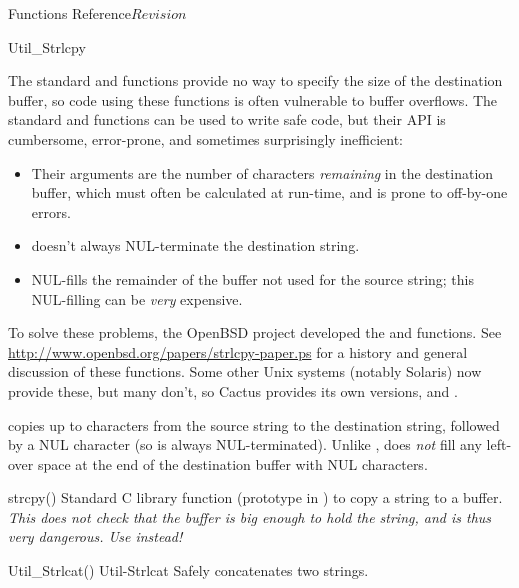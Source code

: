 \begin{cactuspart}{ Functions Reference}{}{$Revision$}
\begin{FunctionDescription}{Util\_Strlcpy}
\begin{Discussion}
The standard  and  functions provide
no way to specify the size of the destination buffer, so code using
these functions is often vulnerable to buffer overflows.  The standard
 and  functions can be used to write
safe code, but their API is cumbersome, error-prone, and sometimes
surprisingly inefficient:
\begin{itemize}
\item	Their  arguments are the number of characters
	{\em remaining\/} in the destination buffer, which must
	often be calculated at run-time, and is prone to off-by-one
	errors.
\item	{} doesn't always NUL-terminate the destination string.
\item	{} NUL-fills the remainder of the buffer not
	used for the source string; this NUL-filling can be {\em very\/}
	expensive.
\end{itemize}

To solve these problems, the OpenBSD project developed the
 and  functions.  See
\url{http://www.openbsd.org/papers/strlcpy-paper.ps}
for a history and general discussion of these functions.
Some other Unix systems (notably Solaris) now provide these,
but many don't, so Cactus provides its own versions,
 and .

 copies up to  characters from the
source string to the destination string, followed by a NUL character
(so  is always NUL-terminated).  Unlike ,
 does {\em not\/} fill any left-over space at
the end of the destination buffer with NUL characters.
\end{Discussion}

\begin{SeeAlsoSection}
\begin{SeeAlso}{strcpy()}
Standard C library function (prototype in )
to copy a string to a buffer.
{\em This does not check that the buffer is big enough to hold the string,
and is thus very dangerous.  Use  instead!}
\end{SeeAlso}
\begin{SeeAlso2} {Util\_Strlcat()} {Util-Strlcat}
Safely concatenates two strings.
\end{SeeAlso2}
\end{SeeAlsoSection}


\end{FunctionDescription}
\end{cactuspart}
